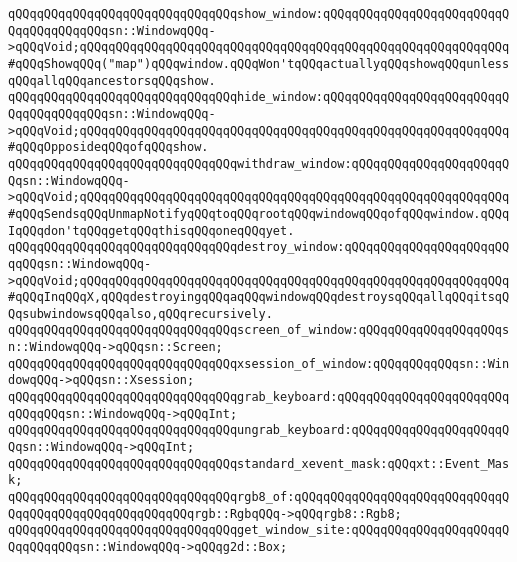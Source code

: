 \newline
\verb|qQQqqQQqqQQqqQQqqQQqqQQqqQQqqQQqshow_window:qQQqqQQqqQQqqQQqqQQqqQQqqQQqqQQqqQQqqQQqsn::WindowqQQq->qQQqVoid;qQQqqQQqqQQqqQQqqQQqqQQqqQQqqQQqqQQqqQQqqQQqqQQqqQQqqQQqqQQq#qQQqShowqQQq("map")qQQqwindow.qQQqWon'tqQQqactuallyqQQqshowqQQqunlessqQQqallqQQqancestorsqQQqshow.|\newline
\verb|qQQqqQQqqQQqqQQqqQQqqQQqqQQqqQQqhide_window:qQQqqQQqqQQqqQQqqQQqqQQqqQQqqQQqqQQqqQQqsn::WindowqQQq->qQQqVoid;qQQqqQQqqQQqqQQqqQQqqQQqqQQqqQQqqQQqqQQqqQQqqQQqqQQqqQQqqQQq#qQQqOpposideqQQqofqQQqshow.|\newline
\verb|qQQqqQQqqQQqqQQqqQQqqQQqqQQqqQQqwithdraw_window:qQQqqQQqqQQqqQQqqQQqqQQqsn::WindowqQQq->qQQqVoid;qQQqqQQqqQQqqQQqqQQqqQQqqQQqqQQqqQQqqQQqqQQqqQQqqQQqqQQqqQQq#qQQqSendsqQQqUnmapNotifyqQQqtoqQQqrootqQQqwindowqQQqofqQQqwindow.qQQqIqQQqdon'tqQQqgetqQQqthisqQQqoneqQQqyet.|\newline
\verb|qQQqqQQqqQQqqQQqqQQqqQQqqQQqqQQqdestroy_window:qQQqqQQqqQQqqQQqqQQqqQQqqQQqsn::WindowqQQq->qQQqVoid;qQQqqQQqqQQqqQQqqQQqqQQqqQQqqQQqqQQqqQQqqQQqqQQqqQQqqQQqqQQq#qQQqInqQQqX,qQQqdestroyingqQQqaqQQqwindowqQQqdestroysqQQqallqQQqitsqQQqsubwindowsqQQqalso,qQQqrecursively.|\newline
\newline
\verb|qQQqqQQqqQQqqQQqqQQqqQQqqQQqqQQqscreen_of_window:qQQqqQQqqQQqqQQqqQQqsn::WindowqQQq->qQQqsn::Screen;|\newline
\verb|qQQqqQQqqQQqqQQqqQQqqQQqqQQqqQQqxsession_of_window:qQQqqQQqqQQqsn::WindowqQQq->qQQqsn::Xsession;|\newline
\newline
\verb|qQQqqQQqqQQqqQQqqQQqqQQqqQQqqQQqgrab_keyboard:qQQqqQQqqQQqqQQqqQQqqQQqqQQqqQQqsn::WindowqQQq->qQQqInt;|\newline
\verb|qQQqqQQqqQQqqQQqqQQqqQQqqQQqqQQqungrab_keyboard:qQQqqQQqqQQqqQQqqQQqqQQqsn::WindowqQQq->qQQqInt;|\newline
\newline
\verb|qQQqqQQqqQQqqQQqqQQqqQQqqQQqqQQqstandard_xevent_mask:qQQqxt::Event_Mask;|\newline
\newline
\verb|qQQqqQQqqQQqqQQqqQQqqQQqqQQqqQQqrgb8_of:qQQqqQQqqQQqqQQqqQQqqQQqqQQqqQQqqQQqqQQqqQQqqQQqqQQqqQQqrgb::RgbqQQq->qQQqrgb8::Rgb8;|\newline
\newline
\newline
\verb|qQQqqQQqqQQqqQQqqQQqqQQqqQQqqQQqget_window_site:qQQqqQQqqQQqqQQqqQQqqQQqqQQqqQQqsn::WindowqQQq->qQQqg2d::Box;|\newline
